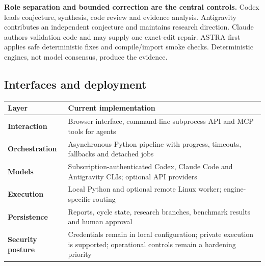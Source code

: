 \documentclass[10pt,a4paper]{article}
\begin{document}
\begin{center}
\end{center}

\begin{darkbox}
\textbf{Role separation and bounded correction are the central controls.}
Codex leads conjecture, synthesis, code review and evidence analysis.
Antigravity contributes an independent conjecture and maintains research direction.
Claude authors validation code and may supply one exact-edit repair. ASTRA first
applies safe deterministic fixes and compile/import smoke checks. Deterministic
engines, not model consensus, produce the evidence.
\end{darkbox}

\subsection*{Interfaces and deployment}

\begin{tabularx}{\textwidth}{@{}>{\bfseries\color{navy}}p{3.2cm} Y@{}}
\toprule
Layer & Current implementation \\
\midrule
Interaction & Browser interface, command-line subprocess API and MCP tools for agents \\
Orchestration & Asynchronous Python pipeline with progress, timeouts, fallbacks and detached jobs \\
Models & Subscription-authenticated Codex, Claude Code and Antigravity CLIs; optional API providers \\
Execution & Local Python and optional remote Linux worker; engine-specific routing \\
Persistence & Reports, cycle state, research branches, benchmark results and human approval \\
Security posture & Credentials remain in local configuration; private execution is supported; operational controls remain a hardening priority \\
\bottomrule
\end{tabularx}
\end{document}
